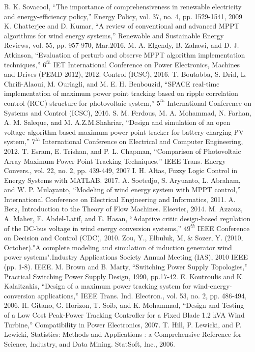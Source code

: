 \begin{thebibliography}{}
B. K. Sovacool, “The importance of comprehensiveness in renewable electricity and energy-efficiency policy,” Energy Policy, vol. 37, no. 4, pp. 1529-1541, 2009
K. Chatterjee and D. Kumar, “A review of conventional and advanced MPPT algorithms for wind energy systems,” Renewable and Sustainable Energy Reviews, vol. 55, pp. 957-970, Mar.2016.
M. A. Elgendy, B. Zahawi, and D. J. Atkinson, “Evaluation of perturb and observe MPPT algorithm implementation techniques,” $6^{th}$ IET International Conference on Power Electronics, Machines and Drives (PEMD 2012), 2012. Control (ICSC), 2016.
T. Boutabba, S. Drid, L. Chrifi-Alaoui, M. Ouriagli, and M. E. H. Benbouzid, “SPACE real-time implementation of maximum power point tracking based on ripple correlation control (RCC) structure for photovoltaic system,”  $5^{th}$ International Conference on Systems and Control (ICSC), 2016.
S. M. Ferdous, M. A. Mohammad, N. Farhan, A. M. Saleque, and M. A.Z.M.Shahriar, “Design and simulation of an open voltage algorithm based maximum power point tracker for battery charging PV system,”  $7^{th}$ International Conference on Electrical and Computer Engineering, 2012.
T. Esram, E. Trishan, and P. L. Chapman, “Comparison of Photovoltaic Array Maximum Power Point Tracking Techniques,” IEEE Trans. Energy Convers., vol. 22, no. 2, pp. 439-449, 2007
I. H. Altas, Fuzzy Logic Control in Energy Systems with MATLAB. 2017.	
A. Soetedjo, S. Aryuanto, L. Abraham, and W. P. Mulayanto, “Modeling of wind energy system with MPPT control,”  International Conference on Electrical Engineering and Informatics, 2011.
A. Betz, Introduction to the Theory of Flow Machines. Elsevier, 2014.
M. Azzouz, A. Maher, E. Abdel-Latif, and E. Hasan, “Adaptive critic design-based regulation of the DC-bus voltage in wind energy conversion systems,” $49^{th}$ IEEE Conference on Decision and Control (CDC), 2010.
Zou, Y., Elbuluk, M, \& Sozer, Y. (2010, October)."A complete modeling and simulation of induction generator wind power systems".Industry Applications Society Annual Meeting (IAS), 2010 IEEE (pp. 1-8). IEEE.
M. Brown and B. Marty, “Switching Power Supply Topologies,” Practical Switching Power Supply Design, 1990, pp.17-42.
E. Koutroulis and K. Kalaitzakis, “Design of a maximum power tracking system for wind-energy-conversion applications,” IEEE Trans. Ind. Electron., vol. 53, no. 2, pp. 486-494, 2006.
H. Gitano, G. Horizon, T. Soib, and K. Mohammad, “Design and Testing of a Low Cost Peak-Power Tracking Controller for a Fixed Blade 1.2 kVA Wind Turbine,”  Compatibility in Power Electronics, 2007.
T. Hill, P. Lewicki, and P. Lewicki, Statistics: Methods and Applications : a Comprehensive Reference for Science, Industry, and Data Mining. StatSoft, Inc., 2006.
\end{thebibliography}



